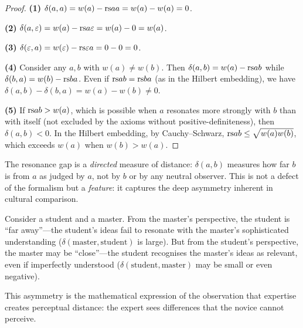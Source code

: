 \begin{proof}
\textbf{(1)} $\delta(a, a) = w(a) - \mathrm{rs}{a}{a} = w(a) - w(a) = 0$.

\textbf{(2)} $\delta(a, \varepsilon) = w(a) - \mathrm{rs}{a}{\varepsilon} = w(a) - 0 = w(a)$.

\textbf{(3)} $\delta(\varepsilon, a) = w(\varepsilon) - \mathrm{rs}{\varepsilon}{a} = 0 - 0 = 0$.

\textbf{(4)} Consider any $a, b$ with $w(a) \neq w(b)$.  Then
$\delta(a, b) = w(a) - \mathrm{rs}{a}{b}$ while $\delta(b, a) = w(b) - \mathrm{rs}{b}{a}$.
Even if $\mathrm{rs}{a}{b} = \mathrm{rs}{b}{a}$ (as in the Hilbert embedding), we have
$\delta(a,b) - \delta(b,a) = w(a) - w(b) \neq 0$.

\textbf{(5)} If $\mathrm{rs}{a}{b} > w(a)$, which is possible when $a$ resonates
more strongly with $b$ than with itself (not excluded by the axioms without
positive-definiteness), then $\delta(a,b) < 0$.  In the Hilbert embedding,
by Cauchy--Schwarz, $\mathrm{rs}{a}{b} \leq \sqrt{w(a) w(b)}$, which exceeds $w(a)$
when $w(b) > w(a)$.
\end{proof}

\begin{interpretation}
The resonance gap is a \emph{directed} measure of distance: $\delta(a,b)$
measures how far $b$ is from $a$ as judged by $a$, not by $b$ or by any
neutral observer.  This is not a defect of the formalism but a \emph{feature}:
it captures the deep asymmetry inherent in cultural comparison.

Consider a student and a master.  From the master's perspective, the student
is ``far away''---the student's ideas fail to resonate with the master's
sophisticated understanding ($\delta(\text{master}, \text{student})$ is large).
But from the student's perspective, the master may be ``close''---the student
recognises the master's ideas as relevant, even if imperfectly understood
($\delta(\text{student}, \text{master})$ may be small or even negative).

This asymmetry is the mathematical expression of the observation that
expertise creates perceptual distance: the expert sees differences that the
novice cannot perceive.
\end{interpretation}

